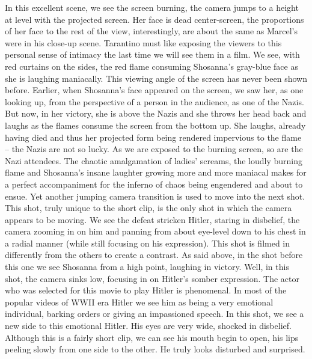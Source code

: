 \documentclass[12pt]{article}
\begin{document}
\begin{flushleft}
                                                In this excellent scene, we see the screen burning, the camera jumps to a height at level with the projected screen. Her face is dead center-screen, the proportions of her face to the rest of the view, interestingly, are about the same as Marcel's were in his close-up scene. Tarantino must like exposing the viewers to this personal sense of intimacy the last time we will see them in a film. We see, with red curtains on the sides, the red flame consuming Shosanna's gray-blue face as she is laughing maniacally.
                                                    This viewing angle of the screen has never been shown before. Earlier, when Shosanna's face appeared on the screen, we saw her, as one looking up, from the perspective of a person in the audience, as one of the Nazis. But now, in her victory, she is above the Nazis and she throws her head back and laughs as the flames consume the screen from the bottom up. She laughs, already having died and thus her projected form being rendered impervious to the flame – the Nazis are not so lucky.
                                                        As we are exposed to the burning screen, so are the Nazi attendees. The chaotic amalgamation of ladies' screams, the loudly burning flame and Shosanna's insane laughter growing more and more maniacal makes for a perfect accompaniment for the inferno of chaos being engendered and about to ensue. 
                                                            Yet another jumping camera transition is used to move into the next shot. This shot, truly unique to the short clip, is the only shot in which the camera appears to be moving. We see the defeat stricken Hitler, staring in disbelief, the camera zooming in on him and panning from about eye-level down to his chest in a radial manner (while still focusing on his expression). This shot is filmed in differently from the others to create a contrast. As said above, in the shot before this one we see Shosanna from a high point, laughing in victory. Well, in this shot, the camera sinks low, focusing in on Hitler's somber expression.
                                                                The actor who was selected for this movie to play Hitler is phenomenal. In most of the popular videos of WWII era Hitler we see him as being a very emotional individual, barking orders or giving an impassioned speech. In this shot, we see a new side to this emotional Hitler. His eyes are very wide, shocked in disbelief. Although this is a fairly short clip, we can see his mouth begin to open, his lips peeling slowly from one side to the other. He truly looks disturbed and surprised. 

\end{flushleft}
\end{document}
